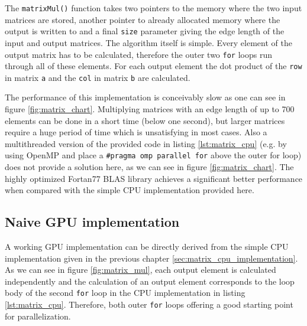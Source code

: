 

The \lstinline!matrixMul()! function takes two pointers to the memory where the two input matrices are stored, another pointer to already allocated memory where the output is written to and a final \lstinline!size! parameter giving the edge length of the input and output matrices.
The algorithm itself is simple. Every element of the output matrix has to be calculated, therefore the outer two \lstinline!for! loops run through all of these elements. For each output element the dot product of the \lstinline!row! in matrix \lstinline!a! and the \lstinline!col! in matrix \lstinline!b! are calculated.

The performance of this implementation is conceivably slow as one can see in figure \ref{fig:matrix_chart}. Multiplying matrices with an edge length of up to 700 elements can be done in a short time (below one second), but larger matrices require a huge period of time which is unsatisfying in most cases.
Also a multithreaded version of the provided code in listing \ref{lst:matrix_cpu} (e.g. by using OpenMP and place a \lstinline!#pragma omp parallel for! above the outer for loop) does not provide a solution here, as we can see in figure \ref{fig:matrix_chart}.
The highly optimized Fortan77 BLAS library \cite{blas_lib} achieves a significant better performance when compared with the simple CPU implementation provided here.

\subsection{Naive GPU implementation}
\label{sec:matrix_mul_naive}

A working GPU implementation can be directly derived from the simple CPU implementation given in the previous chapter \ref{sec:matrix_cpu_implementation}. As we can see in figure \ref{fig:matrix_mul}, each output element is calculated independently and the calculation of an output element corresponds to the loop body of the second \lstinline!for! loop in the CPU implementation in listing \ref{lst:matrix_cpu}. Therefore, both outer \lstinline!for! loops offering a good starting point for parallelization. 

